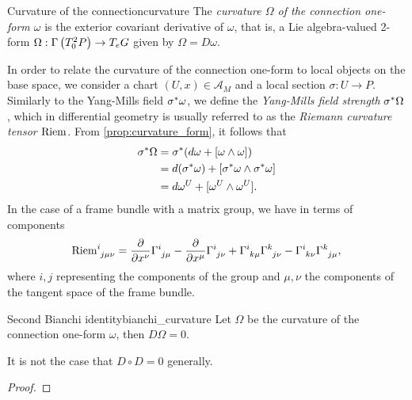 \begin{definition}{Curvature of the connection}{curvature}
    The \emph{curvature \(\Omega\) of the connection one-form \(\omega\)} is the exterior covariant derivative of \(\omega\), that is, a Lie algebra-valued 2-form \(\Omega : \Gamma\left(T^2_0P\right) \to T_eG\) given by \(\Omega = D\omega.\)
\end{definition}

In order to relate the curvature of the connection one-form to local objects on the base space, we consider a chart \((U,x) \in \mathscr{A}_M\) and a local section \(\sigma : U \to P\). Similarly to the Yang-Mills field \({\sigma}^{\ast}_{}{\omega}\), we define the \emph{Yang-Mills field strength} \({\sigma}^{\ast}_{}{\Omega}\), which in differential geometry is usually referred to as the \emph{Riemann curvature tensor \(\operatorname{Riem}\)}. From \cref{prop:curvature_form}, it follows that
\begin{align*}
    {\sigma}^{\ast}_{}{\Omega} &= {\sigma}^{\ast}_{}{\left(d\omega + [\omega \wedge \omega]\right)}\\
                        &= d({\sigma}^{\ast}_{}{\omega}) + [{\sigma}^{\ast}_{}{\omega} \wedge {\sigma}^{\ast}_{}{\omega}]\\
                        &= d\omega^U+ [\omega^U \wedge \omega^U].
\end{align*}
In the case of a frame bundle with a matrix group, we have in terms of components
\begin{equation*}
    \Riem\indices{^i_{j\mu\nu}} = \bfield{x^\nu}\Gamma\indices{^i_{j\mu}} - \bfield{x^\mu}\Gamma\indices{^i_{j\nu}} + \Gamma\indices{^i_{k\mu}}\Gamma\indices{^k_{j\nu}} - \Gamma\indices{^i_{k\nu}}\Gamma\indices{^k_{j\mu}},
\end{equation*}
where \(i,j\) representing the components of the group and \(\mu,\nu\) the components of the tangent space of the frame bundle.

\begin{theorem}{Second Bianchi identity}{bianchi_curvature}
    Let \(\Omega\) be the curvature of the connection one-form \(\omega\), then \(D\Omega = 0\).
\end{theorem}
\begin{remark}
    It is not the case that \(D \circ D = 0\) generally.
\end{remark}
\begin{proof}
    \todo
\end{proof}

